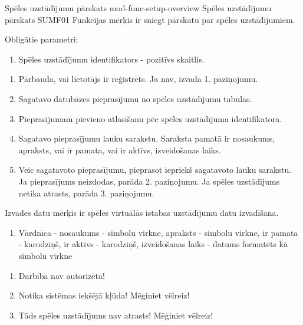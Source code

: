\moduleFunctionTable
{Spēles uzstādījumu pārskats}
{mod-func-setup-overview}
{Spēles uzstādījumu pārskats}
{SUMF01}
{
	Funkcijas mērķis ir sniegt pārskatu par spēles uzstādījumiem.
}
{
	Obligātie parametri:
	\begin{enumerate}
		\item Spēles uzstādījumu identifikators - pozitīvs skaitlis.
	\end{enumerate}
}
{
	\begin{enumerate}
		\item Pārbauda, vai lietotājs ir reģistrēts.
		      Ja nav, izvada 1. paziņojumu.
		\item Sagatavo datubāzes pieprasījumu no spēles uzstādījumu tabulas.
		\item Pieprasījumam pievieno atlasīšanu pēc spēles uzstādījuma identifikatora.
		\item Sagatavo pieprasījumu lauku sarakstu.
		      Saraksta pamatā ir nosaukums, apraksts, vai ir pamata, vai ir aktīvs, izveidošanas laiks.
		\item Veic sagatavoto pieprasījumu, pieprasot iepriekš sagatavoto lauku sarakstu.
		      Ja pieprasījums neizdodas, parāda 2. paziņojumu.
		      Ja spēles uzstādījums netika atrasts, parāda 3. paziņojumu.
	\end{enumerate}
}
{
	Izvades datu mērķis ir spēles virtuālās istabas uzstādījumu datu izvadīšana.
	\begin{enumerate}
		\item Vārdnīca - nosaukums - simbolu virkne, apraksts - simbolu virkne, ir pamata - karodziņš, ir aktīvs - karodziņš, izveidošanas laiks - datums formatēts kā simbolu virkne
	\end{enumerate}
}
{
	\begin{enumerate}
		\item Darbība nav autorizēta!
		\item Notika sistēmas iekšējā kļūda! Mēģiniet vēlreiz!
		\item Tāds spēles uzstādījums nav atrasts! Mēģiniet vēlreiz!
	\end{enumerate}
}
